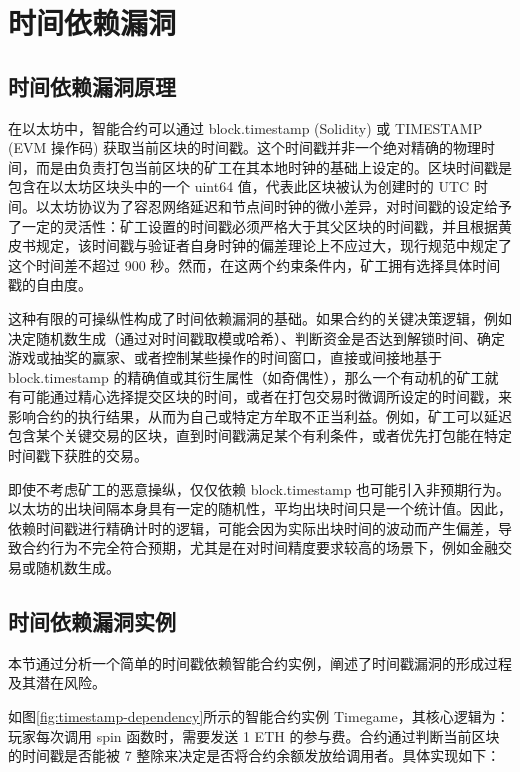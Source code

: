 \documentclass[print, master, vlined, timesmath]{DissertUESTC}
\begin{document}
\section{时间依赖漏洞}
\subsection{时间依赖漏洞原理}

在以太坊中，智能合约可以通过 block.timestamp (Solidity) 或 TIMESTAMP (EVM 操作码) 获取当前区块的时间戳。这个时间戳并非一个绝对精确的物理时间，而是由负责打包当前区块的矿工在其本地时钟的基础上设定的。区块时间戳是包含在以太坊区块头中的一个 uint64 值，代表此区块被认为创建时的 UTC 时间。以太坊协议为了容忍网络延迟和节点间时钟的微小差异，对时间戳的设定给予了一定的灵活性：矿工设置的时间戳必须严格大于其父区块的时间戳，并且根据黄皮书规定，该时间戳与验证者自身时钟的偏差理论上不应过大，现行规范中规定了这个时间差不超过 900 秒。然而，在这两个约束条件内，矿工拥有选择具体时间戳的自由度。

这种有限的可操纵性构成了时间依赖漏洞的基础。如果合约的关键决策逻辑，例如决定随机数生成（通过对时间戳取模或哈希）、判断资金是否达到解锁时间、确定游戏或抽奖的赢家、或者控制某些操作的时间窗口，直接或间接地基于 block.timestamp 的精确值或其衍生属性（如奇偶性），那么一个有动机的矿工就有可能通过精心选择提交区块的时间，或者在打包交易时微调所设定的时间戳，来影响合约的执行结果，从而为自己或特定方牟取不正当利益。例如，矿工可以延迟包含某个关键交易的区块，直到时间戳满足某个有利条件，或者优先打包能在特定时间戳下获胜的交易。

即使不考虑矿工的恶意操纵，仅仅依赖 block.timestamp 也可能引入非预期行为。以太坊的出块间隔本身具有一定的随机性，平均出块时间只是一个统计值。因此，依赖时间戳进行精确计时的逻辑，可能会因为实际出块时间的波动而产生偏差，导致合约行为不完全符合预期，尤其是在对时间精度要求较高的场景下，例如金融交易或随机数生成。

\subsection{时间依赖漏洞实例}
本节通过分析一个简单的时间戳依赖智能合约实例，阐述了时间戳漏洞的形成过程及其潜在风险。

如图\ref{fig:timestamp-dependency}所示的智能合约实例 Timegame，其核心逻辑为：玩家每次调用 spin 函数时，需要发送 1 ETH 的参与费。合约通过判断当前区块的时间戳是否能被 7 整除来决定是否将合约余额发放给调用者。具体实现如下：
\end{document}
